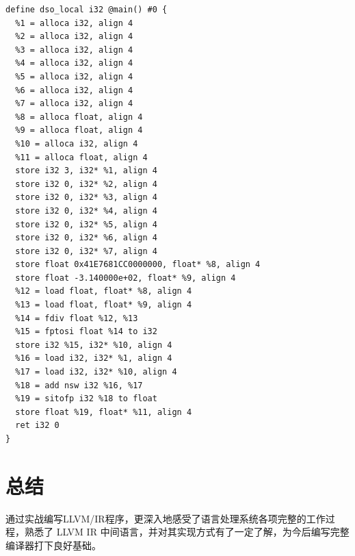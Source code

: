 \documentclass[UTF8,a4paper,10pt]{ctexart}
\begin{document}
\begin{verbatim}
define dso_local i32 @main() #0 {
  %1 = alloca i32, align 4
  %2 = alloca i32, align 4
  %3 = alloca i32, align 4
  %4 = alloca i32, align 4
  %5 = alloca i32, align 4
  %6 = alloca i32, align 4
  %7 = alloca i32, align 4
  %8 = alloca float, align 4
  %9 = alloca float, align 4
  %10 = alloca i32, align 4
  %11 = alloca float, align 4
  store i32 3, i32* %1, align 4
  store i32 0, i32* %2, align 4
  store i32 0, i32* %3, align 4
  store i32 0, i32* %4, align 4
  store i32 0, i32* %5, align 4
  store i32 0, i32* %6, align 4
  store i32 0, i32* %7, align 4
  store float 0x41E7681CC0000000, float* %8, align 4
  store float -3.140000e+02, float* %9, align 4
  %12 = load float, float* %8, align 4
  %13 = load float, float* %9, align 4
  %14 = fdiv float %12, %13
  %15 = fptosi float %14 to i32
  store i32 %15, i32* %10, align 4
  %16 = load i32, i32* %1, align 4
  %17 = load i32, i32* %10, align 4
  %18 = add nsw i32 %16, %17
  %19 = sitofp i32 %18 to float
  store float %19, float* %11, align 4
  ret i32 0
}
\end{verbatim}

\section{总结}
通过实战编写LLVM/IR程序，更深入地感受了语言处理系统各项完整的工作过程，熟悉了 LLVM IR 中间语言，并对其实现方式有了一定了解，为今后编写完整编译器打下良好基础。
\end{document}
